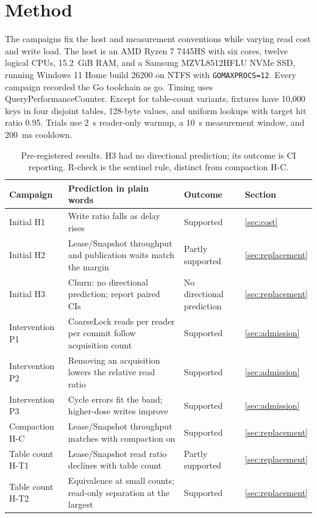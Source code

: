 \documentclass[conference]{IEEEtran}
\begin{document}
\section{Method}
\label{sec:method}
The campaigns fix the host and measurement conventions while varying read cost and write load. The host is an AMD Ryzen 7 7445HS with six cores, twelve logical CPUs, 15.2~GiB RAM, and a Samsung MZVL8512HFLU NVMe SSD, running Windows 11 Home build 26200 on NTFS with \texttt{GOMAXPROCS=12}. Every campaign recorded the Go toolchain as go\GoVersion{}. Timing uses QueryPerformanceCounter. Except for table-count variants, fixtures have 10,000 keys in four disjoint tables, 128-byte values, and uniform lookups with target hit ratio 0.95. Trials use 2~s reader-only warmup, a 10~s measurement window, and 200~ms cooldown.

\begin{table}[t]
\caption{Pre-registered results. H3 had no directional prediction; its outcome is CI reporting. R-check is the sentinel rule, distinct from compaction H-C.}
\label{tab:prereg}\centering\scriptsize\setlength{\tabcolsep}{3pt}
\begin{tabular}{lp{}ll}\toprule
Campaign & Prediction in plain words & Outcome & Section\\\midrule
Initial H1 & Write ratio falls as delay rises & Supported & \ref{sec:cost}\\
Initial H2 & Lease/Snapshot throughput and publication waits match the margin & Partly supported & \ref{sec:replacement}\\
Initial H3 & Churn: no directional prediction; report paired CIs & No directional prediction & \ref{sec:replacement}\\
Intervention P1 & CoarseLock reads per reader per commit follow acquisition count & Supported & \ref{sec:admission}\\
Intervention P2 & Removing an acquisition lowers the relative read ratio & Supported & \ref{sec:admission}\\
Intervention P3 & Cycle errors fit the band; higher-dose writes improve & Supported & \ref{sec:admission}\\
Compaction H-C & Lease/Snapshot throughput matches with compaction on & Supported & \ref{sec:replacement}\\
Table count H-T1 & Lease/Snapshot read ratio declines with table count & Partly supported & \ref{sec:replacement}\\
Table count H-T2 & Equivalence at small counts; read-only separation at the largest & Supported & \ref{sec:replacement}\\

\end{tabular}
\end{table}
\end{document}

